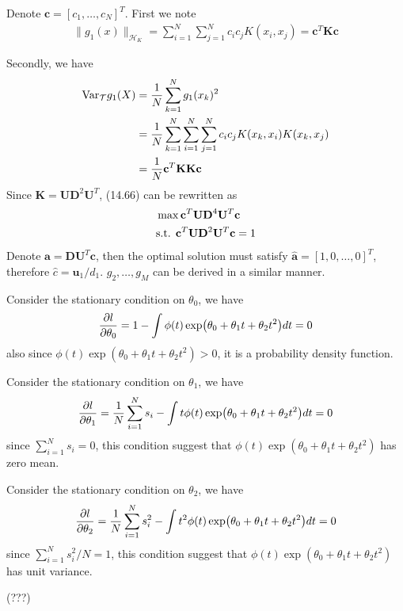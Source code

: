 \begin{exercise}
  Denote $\mathbf{c} = [c_1,\ldots,c_N]^T$. First we note
  \begin{align}
    \|g_1(x)\|_{\mathcal{H}_K} = \sum_{i=1}^N \sum_{j=1}^N c_ic_j
    K(x_i, x_j) = \mathbf{c}^T\mathbf{K}\mathbf{c}
  \end{align}
  
  Secondly, we have
  \begin{align}
    \mbox{Var}_{\mathcal{T}}g_1(X) & = \frac{1}{N}\sum_{k=1}^N g_1(x_k)^2 \notag
    \\
    &= \frac{1}{N} \sum_{k=1}^N \sum_{i=1}^N \sum_{j=1}^N c_ic_jK(x_k,
    x_i)K(x_k, x_j) \notag \\
    &= \frac{1}{N} \mathbf{c}^T\mathbf{KK}\mathbf{c}
  \end{align}
  Since $\mathbf{K} = \mathbf{UD}^2\mathbf{U}^T$, (14.66) can be rewritten as
  \begin{align}
    & \max \mathbf{c}^T\mathbf{UD}^4\mathbf{U}^T\mathbf{c} \\
    & \mbox{s.t. } \mathbf{c}^T\mathbf{UD}^2\mathbf{U}^T\mathbf{c} = 1 \notag
  \end{align}
  Denote $\mathbf{a} = \mathbf{D}\mathbf{U}^T\mathbf{c}$, then the optimal
  solution must satisfy $\hat{\mathbf{a}} = [1,0,\ldots,0]^T$, therefore
  $\hat{c} = \mathbf{u}_1/d_1$. $g_2,\ldots,g_M$ can be derived in a similar
  manner.
\end{exercise}

\begin{exercise}
  Consider the stationary condition on $\theta_0$, we have
  \begin{align}
    \pdv{l}{\theta_0} = 1 - \int\phi(t)\exp(\theta_0 + \theta_1t +
    \theta_2t^2)dt = 0
  \end{align}
  also since $\phi(t)\exp(\theta_0 + \theta_1t + \theta_2t^2) > 0$, it is a
  probability density function.
  
  Consider the stationary condition on $\theta_1$, we have
  \begin{align}
    \pdv{l}{\theta_1} = \frac{1}{N}\sum_{i=1}^Ns_i - \int t\phi(t)\exp(\theta_0
    + \theta_1t + \theta_2t^2)dt = 0
  \end{align}
  since $\sum_{i=1}^Ns_i=0$, this condition suggest that $\phi(t)\exp(\theta_0 +
  \theta_1t + \theta_2t^2)$ has zero mean.
  
  Consider the stationary condition on $\theta_2$, we have
  \begin{align}
    \pdv{l}{\theta_2} = \frac{1}{N}\sum_{i=1}^Ns_i^2 - \int
    t^2\phi(t)\exp(\theta_0 + \theta_1t + \theta_2t^2)dt = 0
  \end{align}
  since $\sum_{i=1}^Ns_i^2 / N=1$, this condition suggest that
  $\phi(t)\exp(\theta_0 + \theta_1t + \theta_2t^2)$ has unit variance.
  
  (???)
\end{exercise}


